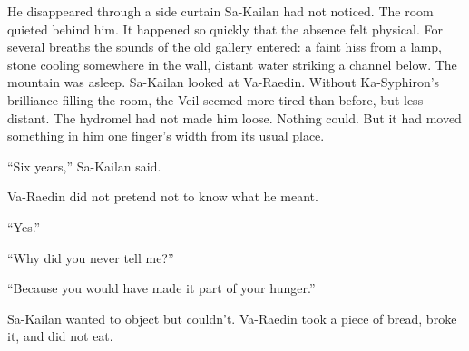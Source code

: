 He disappeared through a side curtain Sa-Kailan had not noticed. The room quieted behind him. 
It happened so quickly that the absence felt physical. 
For several breaths the sounds of the old gallery entered: a faint hiss from a lamp, stone cooling somewhere in the wall, distant water striking a channel below. 
The mountain was asleep.
Sa-Kailan looked at Va-Raedin.
Without Ka-Syphiron’s brilliance filling the room, the Veil seemed more tired than before, but less distant. 
The hydromel had not made him loose. Nothing could. But it had moved something in him one finger’s width from its usual place. \par


“Six years,” Sa-Kailan said.\par
Va-Raedin did not pretend not to know what he meant.\par
“Yes.”\par
“Why did you never tell me?”\par
“Because you would have made it part of your hunger.”\par
Sa-Kailan wanted to object but couldn't.
Va-Raedin took a piece of bread, broke it, and did not eat. \par


